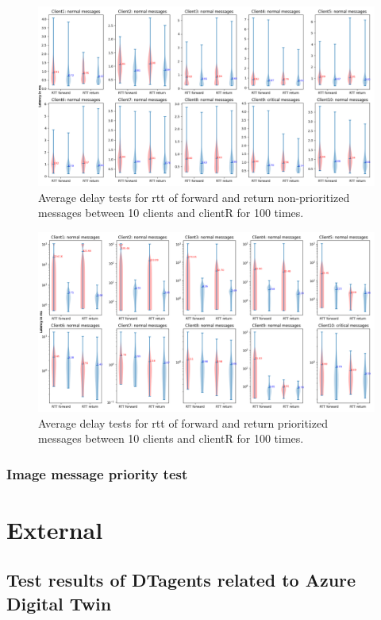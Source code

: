 \begin{figure}
    \centering
    \includegraphics[width=\textheight]{figures/tests/priority_tests/log_violin_10clients_non_priority.png}\hfill 
    \caption{Average delay tests for \gls{rtt} of forward and return non-prioritized messages between 10 clients 
    and clientR for 100 times.} \label{fig: priority-10clients-a}
\end{figure}
\begin{figure}
    \includegraphics[width=\textheight]{figures/tests/priority_tests/log_violin_10clients_priority.png}\hfill 
    \caption{Average delay tests for \gls{rtt} of forward and return prioritized messages between 10 clients 
    and clientR for 100 times.} \label{fig: priority-10clients-b}
\end{figure}



\subsubsection{Image message priority test}

\section{External}\label{chap: Result-External}

\subsection{Test results of DTagents related to Azure Digital Twin} \label{chap: Result-DT}